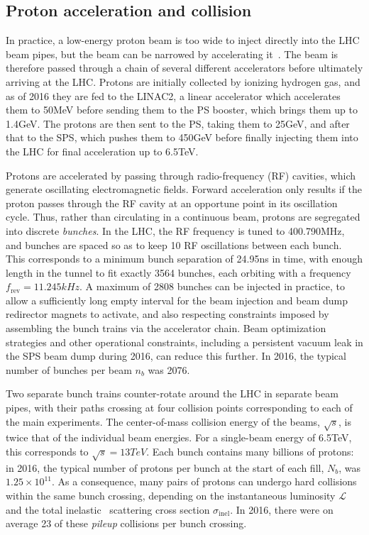 \subsection{Proton acceleration and collision} \label{sec:LHCCMS_LHC_proton_acceleration}
In practice, a low-energy proton beam is too wide to inject directly into the LHC beam pipes, but the beam can be narrowed by accelerating it~\cite{ref:PartPhysLHCEra}.
The beam is therefore passed through a chain of several different accelerators before ultimately arriving at the LHC.
Protons are initially collected by ionizing hydrogen gas, and as of 2016 they are fed to the LINAC2, a linear accelerator which accelerates
them to 50\unit{MeV} before sending them to the PS booster, which brings them up to 1.4\unit{GeV}. The protons are then sent to the PS, taking them to 25\unit{GeV},
and after that to the SPS, which pushes them to 450\unit{GeV} before finally injecting them into the LHC for final acceleration up to 6.5\unit{TeV}.

Protons are accelerated by passing through radio-frequency (RF) cavities, which generate oscillating electromagnetic
fields. Forward acceleration only results if the proton passes through the RF cavity at an opportune point in its oscillation cycle.
Thus, rather than circulating in a continuous beam, protons are segregated into discrete \textit{bunches}. In the LHC, the RF
frequency is tuned to 400.790\unit{MHz}, and bunches are spaced so as to keep 10 RF oscillations between each bunch. This corresponds
to a minimum bunch separation of 24.95\unit{ns} in time, with enough length in the tunnel to fit exactly 3564 bunches, each orbiting
with a frequency $f_\mathrm{rev} = 11.245\unit{kHz}$. A maximum of
2808 bunches can be injected in practice, to allow a sufficiently long empty interval for the beam injection and beam dump
redirector magnets to activate, and also respecting constraints imposed by assembling the bunch trains via the accelerator chain.
Beam optimization strategies and other operational constraints, including a persistent vacuum leak in the SPS beam dump
during 2016, can reduce this further. In 2016, the typical number of bunches per beam $n_b$ was 2076.

Two separate bunch trains counter-rotate around the LHC in separate beam pipes, with their paths crossing at four collision points
corresponding to each of the main experiments. The center-of-mass collision energy of the beams, $\sqrt{s}$, is twice that of the
individual beam energies. For a single-beam energy of 6.5\unit{TeV}, this corresponds to $\sqrt{s} = 13\unit{TeV}$.
Each bunch contains many billions of protons: in 2016, the typical number of protons per bunch at the start of each fill, $N_b$, was $1.25 \times 10^{11}$.
As a consequence, many pairs of protons can undergo hard collisions within the same
bunch crossing, depending on the instantaneous luminosity $\mathcal{L}$ and the total inelastic \Pp\Pp\ scattering cross section $\sigma_\mathrm{inel}$.
In 2016, there were on average 23 of these \textit{pileup} collisions per bunch crossing.

